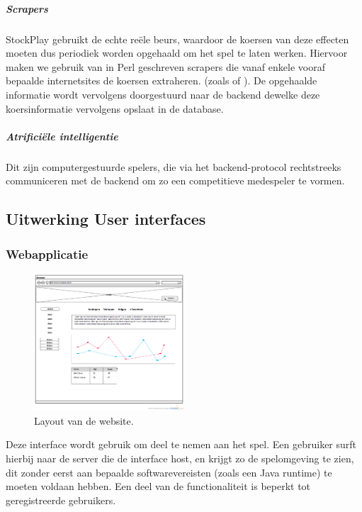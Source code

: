 \subparagraph{Scrapers}
StockPlay gebruikt de echte re\"ele beurs, waardoor de koersen van deze effecten moeten dus periodiek worden opgehaald om het spel te laten werken. Hiervoor maken we gebruik van in Perl geschreven scrapers die vanaf enkele vooraf bepaalde internetsites de koersen extraheren. (zoals  of ).
De opgehaalde informatie wordt vervolgens doorgestuurd naar de backend dewelke deze koersinformatie vervolgens opslaat in de database.

\subparagraph{Atrifici\"ele intelligentie}

Dit zijn computergestuurde spelers, die via het backend-protocol rechtstreeks communiceren met de backend om zo een competitieve medespeler te vormen.


\subsection{Uitwerking User interfaces}

\subsubsection{Webapplicatie}

\begin{figure}[h!]
	\centering
		\includegraphics[width=0.5\textwidth]{images/ontwerp/screenshot_website}
	\caption{Layout van de website.}
\end{figure}

Deze interface wordt gebruik om deel te nemen aan het spel. Een gebruiker surft hierbij naar de server die de interface host, en krijgt zo de spelomgeving te zien, dit zonder eerst aan bepaalde softwarevereisten (zoals een Java runtime) te moeten voldaan hebben. Een deel van de functionaliteit is beperkt tot geregistreerde gebruikers.

